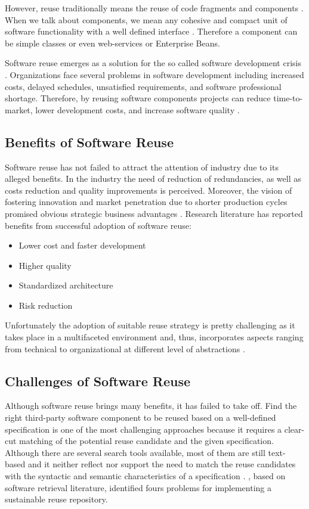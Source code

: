 However, reuse traditionally means the reuse of code fragments and components \cite{Mili2002}. When we talk about components, we mean any cohesive and compact unit of software functionality with a well defined interface \cite{Hummel2008}. Therefore a component can be simple classes or even web-services or Enterprise Beans.

Software reuse emerges as a solution for the so called software development crisis \cite{Kim1992}. Organizations face several problems in software development including increased costs, delayed schedules, unsatisfied requirements, and software professional shortage. Therefore, by reusing software components projects can reduce time-to-market, lower development costs, and increase software quality \cite{Frakes2005}.

\subsection{Benefits of Software Reuse}
Software reuse has not failed to attract the attention of industry due to its alleged benefits. In the industry the need of reduction of redundancies, as well as costs reduction and quality improvements is perceived. Moreover, the vision of fostering innovation and market penetration due to shorter production cycles promised obvious strategic business advantages \cite{Bauer2016}. Research literature has reported benefits from successful adoption of software reuse:

\begin{itemize}
\item Lower cost and faster development
\item Higher quality
\item Standardized architecture
\item Risk reduction
\end{itemize}

Unfortunately the adoption of suitable reuse strategy is pretty challenging as it takes place in a multifaceted environment and, thus, incorporates aspects ranging from technical to organizational at different level of abstractions \cite{Bauer2016}.

\subsection{Challenges of Software Reuse}
\label{sec:sw-challenges}
Although software reuse brings many benefits, it has failed to take off. Find the right third-party software component to be reused based on a well-defined specification is one of the most challenging approaches because it requires a clear-cut matching of the potential reuse candidate and the given specification. Although there are several search tools available, most of them are still text-based and it neither reflect nor support the need to match the reuse candidates with the syntactic and semantic characteristics of a specification \cite{Hummel2013}. \citeauthor{Hummel2013}, based on software retrieval literature, identified fours problems for implementing a sustainable reuse repository.

